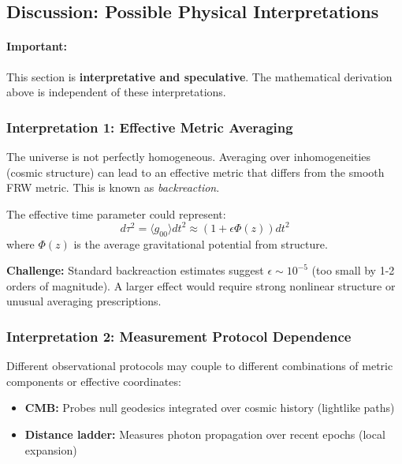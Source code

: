 \subsection{Discussion: Possible Physical Interpretations}

\paragraph{Important:} This section is \textbf{interpretative and speculative}. The mathematical derivation above is independent of these interpretations.

\subsubsection{Interpretation 1: Effective Metric Averaging}

The universe is not perfectly homogeneous. Averaging over inhomogeneities (cosmic structure) can lead to an effective metric that differs from the smooth FRW metric. This is known as \textit{backreaction}.

The effective time parameter could represent:
\begin{equation}
d\tau^2 = \langle g_{00} \rangle dt^2 \approx (1 + \epsilon \Phi(z)) dt^2
\label{eq:backreaction}
\end{equation}
where $\Phi(z)$ is the average gravitational potential from structure.

\textbf{Challenge:} Standard backreaction estimates suggest $\epsilon \sim 10^{-5}$ (too small by 1-2 orders of magnitude). A larger effect would require strong nonlinear structure or unusual averaging prescriptions.

\subsubsection{Interpretation 2: Measurement Protocol Dependence}

Different observational protocols may couple to different combinations of metric components or effective coordinates:
\begin{itemize}
    \item \textbf{CMB:} Probes null geodesics integrated over cosmic history (lightlike paths)
    \item \textbf{Distance ladder:} Measures photon propagation over recent epochs (local expansion)
\end{itemize}

